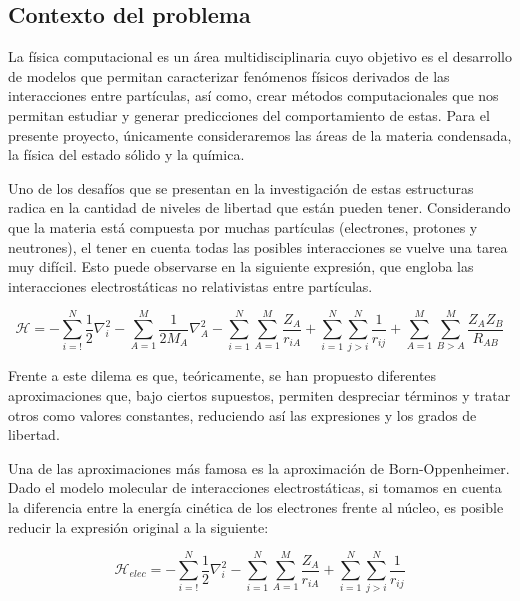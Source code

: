 
\subsection{Contexto del problema}

La física computacional es un área multidisciplinaria cuyo objetivo es el desarrollo de modelos que permitan caracterizar fenómenos físicos derivados de las interacciones entre partículas, así como, crear métodos computacionales que nos permitan estudiar y generar predicciones del comportamiento de estas. Para el presente proyecto, únicamente consideraremos las áreas de la materia condensada, la física del estado sólido y la química.

Uno de los desafíos que se presentan en la investigación de estas estructuras radica en la cantidad de niveles de libertad que están pueden tener. Considerando que la materia está compuesta por muchas partículas (electrones, protones y neutrones), el tener en cuenta todas las posibles interacciones se vuelve una tarea muy difícil. Esto puede observarse en la siguiente expresión, que engloba las interacciones electrostáticas no relativistas entre partículas.

\begin{equation*}
    \mathcal{H} = -\sum_{i=!}^{N}\frac{1}{2}\nabla_i^2 - \sum_{A = 1}^{M} \frac{1}{2M_A}\nabla_A^{2} -\sum_{i=1}^{N}\sum_{A = 1}^{M} \frac{Z_A}{r_{iA}} + \sum_{i=1}^{N}\sum_{j>i}^{N} \frac{1}{r_{ij}}  + \sum_{A=1}^{M}\sum_{B>A}^{M} \frac{Z_AZ_B}{R_{AB}}
\end{equation*}

Frente a este dilema es que, teóricamente, se han propuesto diferentes aproximaciones que, bajo ciertos supuestos, permiten despreciar términos y tratar otros como valores constantes, reduciendo así las expresiones y los grados de libertad.

Una de las aproximaciones más famosa es la aproximación de Born-Oppenheimer\cite{BornOppenheimer}. Dado el modelo molecular de interacciones electrostáticas, si tomamos en cuenta la diferencia entre la energía cinética de los electrones frente al núcleo, es posible reducir la expresión original a la siguiente:

\begin{equation*}
    \mathcal{H}_{elec} = -\sum_{i=!}^{N}\frac{1}{2}\nabla_i^2  -\sum_{i=1}^{N}\sum_{A = 1}^{M} \frac{Z_A}{r_{iA}} + \sum_{i=1}^{N}\sum_{j>i}^{N} \frac{1}{r_{ij}}
\end{equation*}

